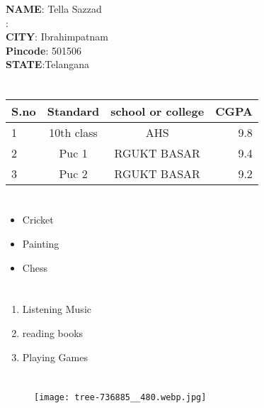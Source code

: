 \documentclass[a4paper,10pt]{article}
\title{\textbf{\color{red}{RESUME}}}
\begin{document}
\maketitle
\section{{\color{blue}{INTRODUCTION TO MYSELF}}}
\textbf{NAME}: Tella Sazzad\\
\textbf{{\color{black}{ADDRESS}}}:\\
\textbf{CITY}: Ibrahimpatnam\\
\textbf{Pincode}: 501506\\
\textbf{STATE}:{Telangana}\\

\section{{\color{blue}{EDUCATION DETAILS}}}
\begin{tabular}{|l|c|c|r|}
\hline
\centering
\textbf{S.no}&\textbf{Standard}&\textbf{school or college}&\textbf{CGPA}\\
\hline
1 & 10th class & AHS & 9.8\\
\hline
2 & Puc 1 & RGUKT BASAR & 9.4\\
\hline
3 & Puc 2 & RGUKT BASAR & 9.2\\
\hline
\end{tabular}
\section{{\color{blue}{EXTRA CURRICULAR ACTIVITIES}}}
\begin{itemize}
\item Cricket
\item Painting
\item Chess
\end{itemize}
\section{{\color{blue}{HOBBIES}}}
\begin{enumerate}
\item Listening Music
\item reading books
\item Playing Games
\end{enumerate}
\section{{\color{blue}{IMAGE}}}
\begin{figure}[h]
\texttt{[image: tree-736885\_\_480.webp.jpg]}
\end{figure}
\end{document}

